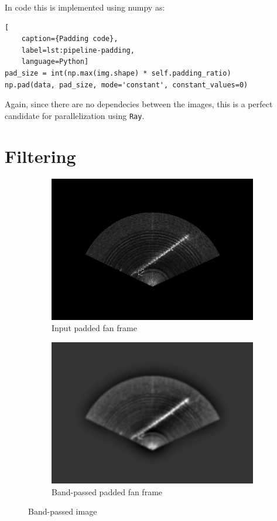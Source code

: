 In code this is implemented using numpy as:
\begin{lstlisting}[
    caption={Padding code},
    label=lst:pipeline-padding,
    language=Python]
pad_size = int(np.max(img.shape) * self.padding_ratio)
np.pad(data, pad_size, mode='constant', constant_values=0)
\end{lstlisting}

Again, since there are no dependecies between the images, this is a perfect candidate for parallelization using \texttt{Ray}.

\section{Filtering}

\begin{figure}[H]
    \centering
    \begin{subfigure}[b]{.45\textwidth}
        \centering
        \includegraphics[width=\textwidth]{figures/pipeline/Padding.png}
        \caption{Input padded fan frame}
    \end{subfigure}
    \hfill
    \begin{subfigure}[b]{.45\textwidth}
        \centering
        \includegraphics[width=\textwidth]{figures/pipeline/Bandpass.png}
        \caption{Band-passed padded fan frame}
    \end{subfigure}
    \caption{Band-passed image}
    \label{fig:resizing}
\end{figure}

